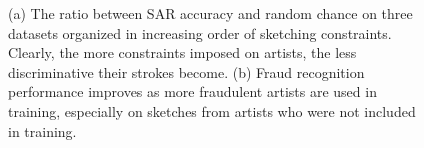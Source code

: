 
\begin{figure}[htbp!]
\centering
{}\hspace{-3mm}
\vspace{-2mm}\caption{(a) The ratio between SAR accuracy and random chance on three datasets organized in increasing order of sketching constraints. Clearly, the more constraints imposed on artists, the less discriminative their strokes become. (b) Fraud recognition performance improves as more fraudulent artists are used in training, especially on sketches from artists who were not included in training.}\vspace{-3mm}
\end{figure}


